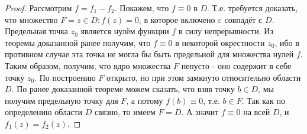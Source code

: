 \begin{proof}
	Рассмотрим $f = f_1 - f_2$. Покажем, что $f \equiv 0$ в $D$. Т.е. требуется доказать, что множество $F = {z\in D: f(z) = 0}$, в которое включено $\varepsilon$ совпадёт с $D$. Предельная точка $z_0$ является нулём функции $f$ в силу непрерывности. Из теоремы доказанной ранее получим, что $f \equiv 0$ в некоторой окрестности $z_0$, ибо в противном случае эта точка не могла бы быть предельной для множества нулей $f$. Таким образом, получим, что ядро множества $F$ непусто - оно содержит в себе точку $z_0$. По построению $F$ открыто, но при этом замкнуто относительно области $D$. По ранее доказанной теореме можем сказать, что взяв точку $b \in D$, мы получим предельную точку для $F$, а потому $f(b) \equiv 0$, т.е. $b \in F$. Так как по определению области $D$ связно, то имеем $F = D$. А значит $f \equiv 0$ на всей $D$, и $f_1(z) = f_2(z)$.
\end{proof}